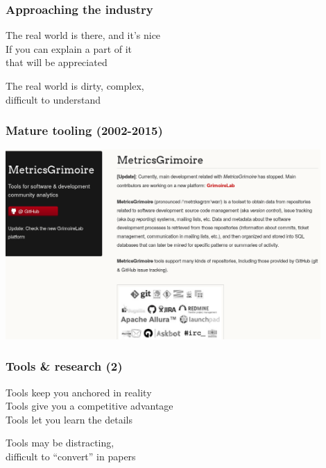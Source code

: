 \documentclass[17pt,aspectratio=169,hyperref=pdfusetitle]{beamer}
\begin{document}
\begin{frame}[fragile]
  \frametitle{Approaching the industry}

  The real world is there, and it's nice \\
  If you can explain a part of it \\
  that will be appreciated \\
  
  \begin{center}
    The real world is dirty, complex, \\
    difficult to understand \\
  \end{center}  
  
\end{frame}

\begin{frame}[fragile]
  \frametitle{Mature tooling (2002-2015)}

  \begin{center}
  \includegraphics[width=12cm]{figs/metricsgrimoire}
  \end{center}  
  
\end{frame}

\begin{frame}[fragile]
  \frametitle{Tools \& research (2)}

  Tools keep you anchored in reality \\
  Tools give you a competitive advantage \\
  Tools let you learn the details \\
  
  \begin{center}
    Tools may be distracting, \\
    difficult to ``convert'' in papers \\
  \end{center}  
  
\end{frame}
\end{document}
